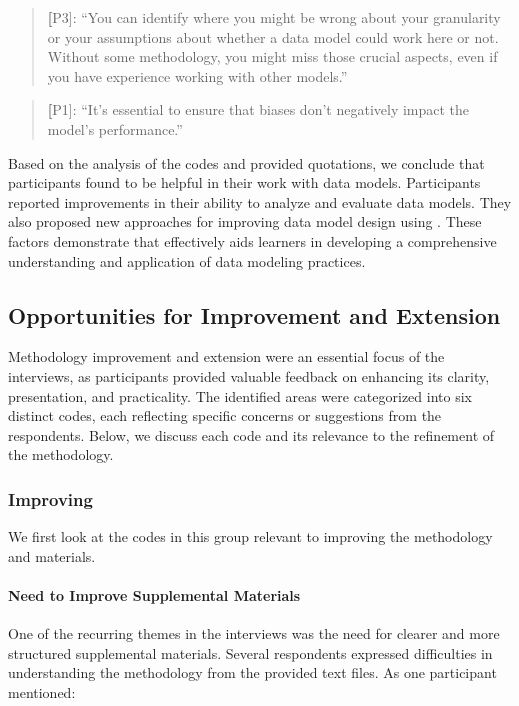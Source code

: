 \begin{quote}
      \textbf[P3]: ``You can identify where you might be wrong about your granularity or your assumptions about whether a data model could work here or not. Without some methodology, you might miss those crucial aspects, even if you have experience working with other models.''
\end{quote}
\begin{quote}
      \textbf[P1]: ``It's essential to ensure that biases don’t negatively impact the model's performance.''
\end{quote}

Based on the analysis of the codes and provided quotations, we conclude that participants found \credal to be helpful in their work with data models.  Participants reported improvements in their ability to analyze and evaluate data models. They also proposed new approaches for improving data model design using \credal. These factors demonstrate that \credal effectively aids learners in developing a comprehensive understanding and application of data modeling practices.

\subsection{Opportunities for Improvement and Extension}
\label{sec:improvements}
Methodology improvement and extension were an essential focus of the interviews, as participants provided valuable feedback on enhancing its clarity, presentation, and practicality. The identified areas were categorized into six distinct codes, each reflecting specific concerns or suggestions from the respondents. Below, we discuss each code and its relevance to the refinement of the methodology.

\subsubsection{Improving \credal} We first look at the codes in this group relevant to improving the methodology and materials.

\paragraph{Need to Improve Supplemental Materials}
One of the recurring themes in the interviews was the need for clearer and more structured supplemental materials. Several respondents expressed difficulties in understanding the methodology from the provided text files. As one participant mentioned:

